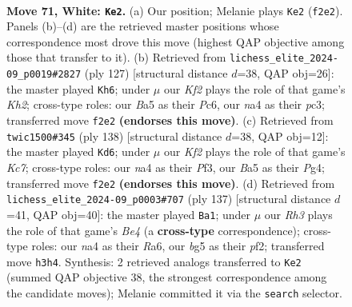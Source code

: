 \documentclass[11pt]{article}
\begin{document}
\clearpage

\begin{figure}[p]\centering
\begin{subfigure}{0.46\textwidth}\centering
\resizebox{\linewidth}{!}{%
\newchessgame
\chessboard[
  setfen={8/8/B2p1k1p/B3p1b1/n3P2p/1r3P1R/5K2/8 w - - 11 71},
  showmover=false,
  pgfstyle=straightmove, color=movearrow, markmove={f2-e2}
]}
\caption{}
\end{subfigure}\hfill
\begin{subfigure}{0.46\textwidth}\centering
\resizebox{\linewidth}{!}{%
\newchessgame
\chessboard[
  setfen={8/2R3pk/2p1p3/7P/3P1K1P/2P2bB1/8/5r2 b - - 44 64},
  showmover=false,
  pgfstyle=straightmove, color=movearrow, markmove={h7-h6}
]}
\caption{}
\end{subfigure}
\\[4pt]
\begin{subfigure}{0.46\textwidth}\centering
\resizebox{\linewidth}{!}{%
\newchessgame
\chessboard[
  setfen={4Brk1/2K3p1/4Rb1p/4p2P/6P1/5P2/8/8 w - - 17 70},
  showmover=false,
  pgfstyle=straightmove, color=movearrow, markmove={c7-d6}
]}
\caption{}
\end{subfigure}\hfill
\begin{subfigure}{0.46\textwidth}\centering
\resizebox{\linewidth}{!}{%
\newchessgame
\chessboard[
  setfen={8/1R3pk1/r5p1/4b2p/7P/4BKP1/5P2/8 b - - 30 69},
  showmover=false,
  pgfstyle=straightmove, color=movearrow, markmove={e5-a1}
]}
\caption{}
\end{subfigure}
\caption{\textbf{Move 71, White: \texttt{Ke2}.} (a) Our position; Melanie plays \texttt{Ke2} (\texttt{f2e2}). Panels (b)--(d) are the retrieved master positions whose correspondence most drove this move (highest QAP objective among those that transfer to it). (b) Retrieved from \texttt{lichess\_elite\_2024-09\_p0019\#2827} (ply 127) [structural distance $d$=38, QAP obj=26]: the master played \texttt{Kh6}; under $\mu$ our \emph{Kf2} plays the role of that game's \emph{Kh2}; cross-type roles: our \emph{B}a5 as their \emph{P}c6, our \emph{n}a4 as their \emph{p}c3; transferred move \texttt{f2e2} \textbf{(endorses this move)}. (c) Retrieved from \texttt{twic1500\#345} (ply 138) [structural distance $d$=38, QAP obj=12]: the master played \texttt{Kd6}; under $\mu$ our \emph{Kf2} plays the role of that game's \emph{Kc7}; cross-type roles: our \emph{n}a4 as their \emph{P}f3, our \emph{B}a5 as their \emph{P}g4; transferred move \texttt{f2e2} \textbf{(endorses this move)}. (d) Retrieved from \texttt{lichess\_elite\_2024-09\_p0003\#707} (ply 137) [structural distance $d$=41, QAP obj=40]: the master played \texttt{Ba1}; under $\mu$ our \emph{Rh3} plays the role of that game's \emph{Be4} (a \textbf{cross-type} correspondence); cross-type roles: our \emph{n}a4 as their \emph{R}a6, our \emph{b}g5 as their \emph{p}f2; transferred move \texttt{h3h4}. Synthesis: 2 retrieved analogs transferred to \texttt{Ke2} (summed QAP objective 38, the strongest correspondence among the candidate moves); Melanie committed it via the \texttt{search} selector.}
\label{fig:thought-m140}
\end{figure}
\end{document}
